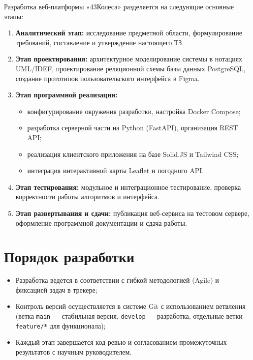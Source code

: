 \documentclass[a4paper,12pt]{article}
\begin{document}
Разработка веб-платформы «43Колеса» разделяется на следующие основные этапы:
\begin{enumerate}
	\item \textbf{Аналитический этап:} исследование предметной области, формулирование требований, составление и утверждение настоящего ТЗ.
	\item \textbf{Этап проектирования:} архитектурное моделирование системы в нотациях UML/IDEF, проектирование реляционной схемы базы данных PostgreSQL, создание прототипов пользовательского интерфейса в Figma.
	\item \textbf{Этап программной реализации:}
	      \begin{itemize}
		      \item конфигурирование окружения разработки, настройка Docker Compose;
		      \item разработка серверной части на Python (FastAPI), организация REST API;
		      \item реализация клиентского приложения на базе Solid.JS и Tailwind CSS;
		      \item интеграция интерактивной карты Leaflet и погодного API.
	      \end{itemize}
	\item \textbf{Этап тестирования:} модульное и интеграционное тестирование, проверка корректности работы алгоритмов и интерфейса.
	\item \textbf{Этап развертывания и сдачи:} публикация веб-сервиса на тестовом сервере, оформление программной документации и сдача работы.
\end{enumerate}

\section{Порядок разработки}

\begin{itemize}
	\item Разработка ведется в соответствии с гибкой методологией (Agile) и фиксацией задач в трекере;
	\item Контроль версий осуществляется в системе Git с использованием ветвления (ветка \texttt{main} — стабильная версия, \texttt{develop} — разработка, отдельные ветки \texttt{feature/*} для функционала);
	\item Каждый этап завершается код-ревью и согласованием промежуточных результатов с научным руководителем.
\end{itemize}
\end{document}
